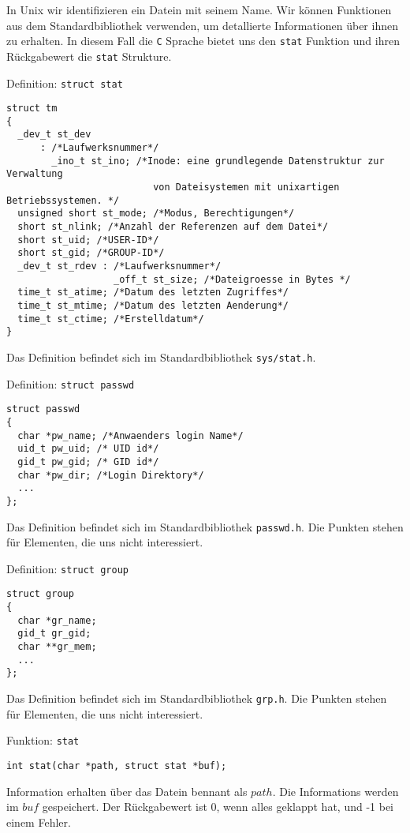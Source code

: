 In Unix wir identifizieren ein Datein mit seinem Name. Wir können Funktionen aus dem Standardbibliothek verwenden, um
detallierte Informationen über ihnen zu erhalten. In diesem Fall die \texttt{C} Sprache bietet uns den \texttt{stat} Funktion 
und ihren Rückgabewert die \texttt{stat} Strukture. 
\begin{myexampleblock}{Definition: \texttt{struct stat}}
\begin{lstlisting}
struct tm
{
  _dev_t st_dev
      : /*Laufwerksnummer*/
        _ino_t st_ino; /*Inode: eine grundlegende Datenstruktur zur Verwaltung
                          von Dateisystemen mit unixartigen Betriebssystemen. */
  unsigned short st_mode; /*Modus, Berechtigungen*/
  short st_nlink; /*Anzahl der Referenzen auf dem Datei*/
  short st_uid; /*USER-ID*/
  short st_gid; /*GROUP-ID*/
  _dev_t st_rdev : /*Laufwerksnummer*/
                   _off_t st_size; /*Dateigroesse in Bytes */
  time_t st_atime; /*Datum des letzten Zugriffes*/
  time_t st_mtime; /*Datum des letzten Aenderung*/
  time_t st_ctime; /*Erstelldatum*/
}
\end{lstlisting}
\vspace{-0.4cm}
Das Definition befindet sich im Standardbibliothek \texttt{sys/stat.h}.
\end{myexampleblock}
\begin{myexampleblock}{Definition: \texttt{struct passwd}}
\begin{lstlisting}
struct passwd
{
  char *pw_name; /*Anwaenders login Name*/
  uid_t pw_uid; /* UID id*/
  gid_t pw_gid; /* GID id*/
  char *pw_dir; /*Login Direktory*/
  ...
};
\end{lstlisting}
\vspace{-0.4cm}
Das Definition befindet sich im Standardbibliothek \texttt{passwd.h}.
Die Punkten stehen für Elementen, die uns nicht interessiert.
\end{myexampleblock}
\begin{myexampleblock}{Definition: \texttt{struct group}}
\begin{lstlisting}
struct group
{
  char *gr_name;
  gid_t gr_gid;
  char **gr_mem;
  ...
};
\end{lstlisting}
\vspace{-0.4cm}
Das Definition befindet sich im Standardbibliothek \texttt{grp.h}.
Die Punkten stehen für Elementen, die uns nicht interessiert.
\end{myexampleblock}
\begin{myexampleblock}{Funktion: \texttt{stat}}
\begin{lstlisting}
int stat(char *path, struct stat *buf);
\end{lstlisting}
\vspace{-.4cm}
Information erhalten über das Datein bennant als $path$. Die Informations werden im $buf$ gespeichert.
Der Rückgabewert ist 0, wenn alles geklappt hat, und -1 bei einem Fehler.
\end{myexampleblock}

